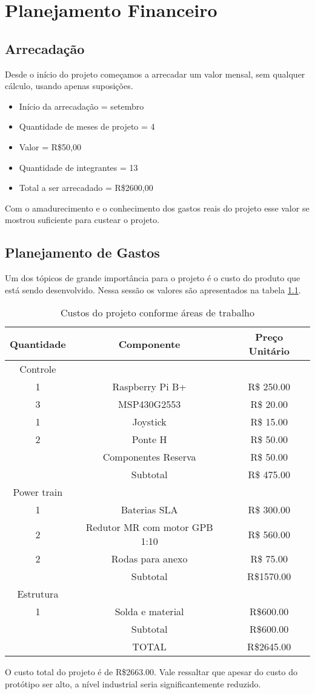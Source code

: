 \chapter[Planejamento Financeiro]{Planejamento Financeiro}
\section {Arrecadação}
Desde o início do projeto começamos a arrecadar um valor mensal, sem qualquer cálculo, usando apenas suposições.
  \begin{itemize}
    \item Início da arrecadação = setembro
    \item Quantidade de meses de projeto = 4
    \item Valor = R\$50,00
    \item Quantidade de integrantes = 13
    \item Total a ser arrecadado = R\$2600,00
  \end{itemize}
Com o amadurecimento e o conhecimento dos gastos reais do projeto esse valor se mostrou suficiente para custear o projeto.

\section {Planejamento de Gastos}

Um dos tópicos de grande importância para o projeto é o custo do produto que está sendo desenvolvido. Nessa sessão os valores são apresentados na tabela \ref{tab:custos_tabela}.

\begin{table}[!ht]
\centering
\begin{tabular}{ |c|c|c| }
 \hline
Quantidade & Componente & Preço Unitário\\
 \hline
Controle &  & \\
 1 & Raspberry Pi B+   &  R\$ 250.00 \\
 3 & MSP430G2553  & R\$ 20.00 \\
 1 & Joystick  & R\$ 15.00 \\
 2 & Ponte H &  R\$ 50.00 \\
  & Componentes Reserva & R\$ 50.00\\
& Subtotal & R\$ 475.00\\ \hline

Power train &  & \\
1 & Baterias SLA  & R\$ 300.00\\
2 & Redutor MR com motor GPB 1:10 &  R\$ 560.00\\
2 & Rodas para anexo & R\$ 75.00\\
& Subtotal &  R\$1570.00\\ \hline

Estrutura &  & \\
1 &  Solda e material & R\$600.00\\
 & Subtotal & R\$600.00 \\ \hline

& TOTAL &  R\$2645.00\\ \hline
\end{tabular}
\caption{Custos do projeto conforme áreas de trabalho}
\label{tab:custos_tabela}
\end{table}

O custo total do projeto é de R\$2663.00.  Vale ressaltar que apesar do custo do protótipo ser alto, a nível industrial seria significantemente reduzido.
